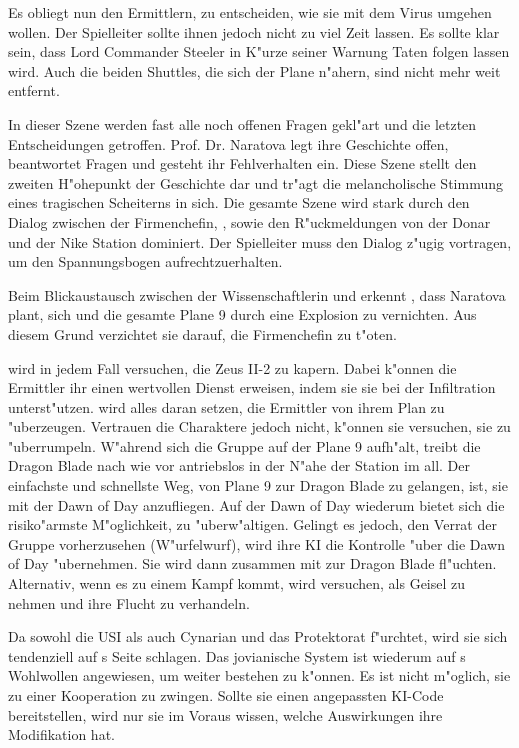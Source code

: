Es obliegt nun den Ermittlern, zu entscheiden, wie sie mit dem Virus umgehen wollen. Der Spielleiter sollte ihnen jedoch nicht zu viel Zeit lassen. Es sollte klar sein, dass Lord Commander Steeler in K"urze seiner Warnung Taten folgen lassen wird. Auch die beiden Shuttles, die sich der Plane n"ahern, sind nicht mehr weit entfernt.

\vfill
\newpage

\begin{remarks}
	In dieser Szene werden fast alle noch offenen Fragen gekl"art und die letzten Entscheidungen getroffen. Prof. Dr. Naratova legt ihre Geschichte offen, beantwortet Fragen und gesteht ihr Fehlverhalten ein. Diese Szene stellt den zweiten H"ohepunkt der Geschichte dar und tr"agt die melancholische Stimmung eines tragischen Scheiterns in sich. Die gesamte Szene wird stark durch den Dialog zwischen der Firmenchefin, \xl{}, \ml{} sowie den R"uckmeldungen von der Donar und der Nike Station dominiert. Der Spielleiter muss den Dialog z"ugig vortragen, um den Spannungsbogen aufrechtzuerhalten.

	Beim Blickaustausch zwischen der Wissenschaftlerin und \xl{} erkennt \xl{}, dass Naratova plant, sich und die gesamte Plane 9 durch eine Explosion zu vernichten. Aus diesem Grund verzichtet sie darauf, die Firmenchefin zu t"oten.

	\xl{} wird in jedem Fall versuchen, die Zeus II-2 zu kapern. Dabei k"onnen die Ermittler ihr einen wertvollen Dienst erweisen, indem sie sie bei der Infiltration unterst"utzen. \xl{} wird alles daran setzen, die Ermittler von ihrem Plan zu "uberzeugen. Vertrauen die Charaktere \xl{} jedoch nicht, k"onnen sie versuchen, sie zu "uberrumpeln. W"ahrend sich die Gruppe auf der Plane 9 aufh"alt, treibt die Dragon Blade nach wie vor antriebslos in der N"ahe der Station im all. Der einfachste und schnellste Weg, von Plane 9 zur Dragon Blade zu gelangen, ist, sie mit der Dawn of Day anzufliegen. Auf der Dawn of Day wiederum bietet sich die risiko"armste M"oglichkeit, \xl{} zu "uberw"altigen. Gelingt es \xl{} jedoch, den Verrat der Gruppe vorherzusehen (W"urfelwurf), wird ihre KI die Kontrolle "uber die Dawn of Day "ubernehmen. Sie wird dann zusammen mit \ml{} zur Dragon Blade fl"uchten. Alternativ, wenn es zu einem Kampf kommt, wird \xl{} versuchen, \ml{} als Geisel zu nehmen und ihre Flucht zu verhandeln.

	Da \ml{} sowohl die USI als auch Cynarian und das Protektorat f"urchtet, wird sie sich tendenziell auf \xl{}s Seite schlagen. Das jovianische System ist wiederum auf \ml{}s Wohlwollen angewiesen, um weiter bestehen zu k"onnen. Es ist nicht m"oglich, sie zu einer Kooperation zu zwingen. Sollte sie einen angepassten KI-Code bereitstellen, wird nur sie im Voraus wissen, welche Auswirkungen ihre Modifikation hat.


\end{remarks}
